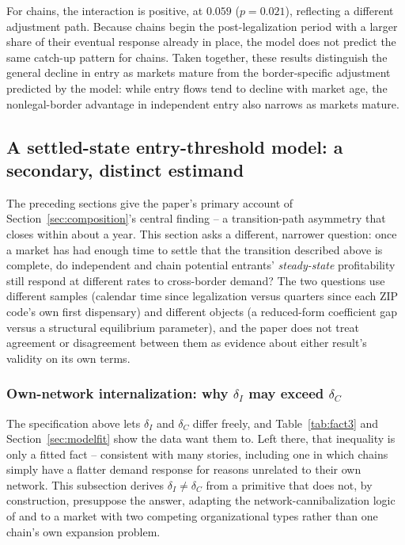 \documentclass[english,12pt]{article}
\begin{document}
For chains, the interaction is positive, at $0.059$ ($p=0.021$), reflecting a different adjustment path. Because chains begin the post-legalization period with a larger share of their eventual response already in place, the model does not predict the same catch-up pattern for chains. Taken together, these results distinguish the general decline in entry as markets mature from the border-specific adjustment predicted by the model: while entry flows tend to decline with market age, the nonlegal-border advantage in independent entry also narrows as markets mature. 

\subsection{A settled-state entry-threshold model: a secondary, distinct estimand}
\label{sec:settledgame}

The preceding sections give the paper's primary account of Section~\ref{sec:composition}'s central finding -- a transition-path asymmetry that closes within about a year. This section asks a different, narrower question: once a market has had enough time to settle that the transition described above is complete, do independent and chain potential entrants' \emph{steady-state} profitability still respond at different rates to cross-border demand? The two questions use different samples (calendar time since legalization versus quarters since each ZIP code's own first dispensary) and different objects (a reduced-form coefficient gap versus a structural equilibrium parameter), and the paper does not treat agreement or disagreement between them as evidence about either result's validity on its own terms.
\color{red}
\subsubsection{Own-network internalization: why \texorpdfstring{$\delta_I$}{delta	extunderscore I} may exceed \texorpdfstring{$\delta_C$}{delta	extunderscore C}}
\label{sec:cannibalization}

The specification above lets $\delta_I$ and $\delta_C$ differ freely, and Table~\ref{tab:fact3} and Section~\ref{sec:modelfit} show the data want them to. Left there, that inequality is only a fitted fact -- consistent with many stories, including one in which chains simply have a flatter demand response for reasons unrelated to their own network. This subsection derives $\delta_I \neq \delta_C$ from a primitive that does not, by construction, presuppose the answer, adapting the network-cannibalization logic of \citet{Nishida2008} and \citet{Holmes2011} to a market with two competing organizational types rather than one chain's own expansion problem.
\end{document}
